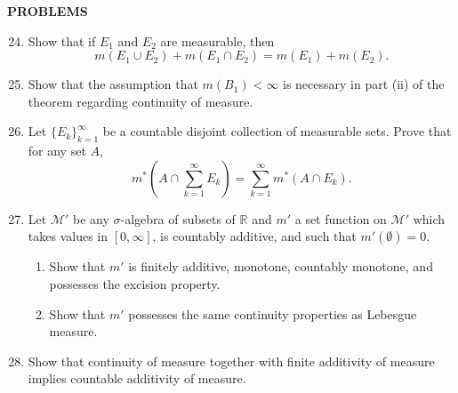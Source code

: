 \begin{center}
	\textbf{PROBLEMS}
\end{center}
\begin{enumerate}
	\setcounter{enumi}{23}
	\item Show that if $E_1$ and $E_2$ are measurable, then
	\[
		m(E_1\cup E_2)+m(E_1\cap E_2) = m(E_1)+m(E_2).	
	\]
	\item Show that the assumption that $m(B_1)<\infty$ is necessary in part (ii) of the theorem regarding continuity of measure.
	\item Let $\{E_k\}_{k=1}^\infty$ be a countable disjoint collection of measurable sets. Prove that for any set $A$, 
	\[
		m^*(A\cap\sum_{k=1}^\infty E_k)=\sum_{k=1}^\infty m^*(A\cap E_k).	
	\]
	\item Let $\mathcal{M}'$ be any $\sigma$-algebra of subsets of $\mathbb{R}$ and $m'$ a set function on $\mathcal{M}'$ which takes values in $[0,\infty]$, is countably additive, and such that $m'(\emptyset)=0$.
	\begin{enumerate}[label=(\roman*),align=left]
		\item Show that $m'$ is finitely additive, monotone, countably monotone, and possesses the excision property.
		\item Show that $m'$ possesses the same continuity properties as Lebesgue measure.
	\end{enumerate}
	\item Show that continuity of measure together with finite additivity of measure implies countable additivity of measure.
\end{enumerate}

